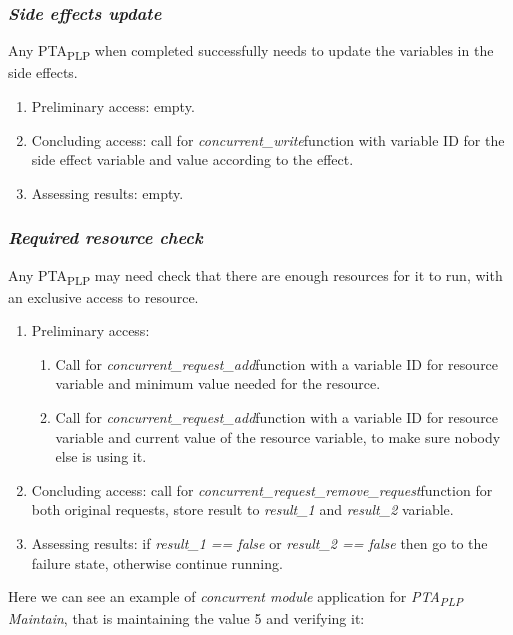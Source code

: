 \subsubsection{\textit{Side effects update} \label{memory_module_applications_side_effects_update}}
Any PTA\textsubscript{PLP} when completed successfully needs to update the variables in the side effects.
\begin{enumerate} 
\item Preliminary access: empty.
\item Concluding access: call for \textcolor{ColorUppaalFunction}{\textit{concurrent_write}}​ function with variable ID for the side effect variable and value according to the effect. 
\item Assessing results: empty.
\end{enumerate}
\subsubsection{\textit{Required resource check} \label{memory_module_applications_required_resource_check}}
Any PTA\textsubscript{PLP} may need check that there are enough resources for it to run, with an exclusive access to resource.
\begin{enumerate} 
\item Preliminary access:
\begin{enumerate} 
\item Call for \textcolor{ColorUppaalFunction}{\textit{concurrent_request_add}}​ function with a variable ID for resource variable and minimum value needed for the resource. 
\item Call for \textcolor{ColorUppaalFunction}{\textit{concurrent_request_add}}​ function with a variable ID for resource variable and current value of the resource variable, to make sure nobody else is using it.
\end{enumerate} 
\item Concluding access: call for \textcolor{ColorUppaalFunction}{\textit{concurrent_request_remove_request}}​ function for both original requests, store result to \textcolor{ColorEdgeGuard}{\textit{result_1}} and \textcolor{ColorEdgeGuard}{\textit{result_2}} variable. 
\item Assessing results: if \textcolor{ColorEdgeGuard}{\textit{result_1 == false}} or \textcolor{ColorEdgeGuard}{\textit{result_2 == false}} then go to the failure state, otherwise continue running.
\end{enumerate}    
Here we can see an example of \textit{concurrent module} application for \textit{PTA\textsubscript{PLP} Maintain}, that is maintaining the value 5 and verifying it:   \clearpage

